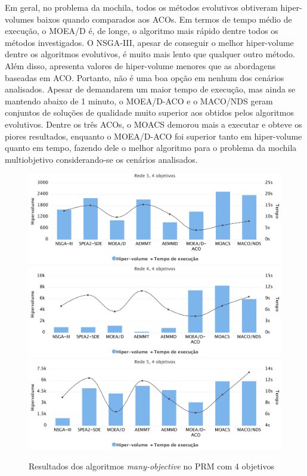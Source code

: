 Em geral, no problema da mochila, todos os métodos evolutivos obtiveram hiper-volumes baixos quando comparados aos ACOs. Em termos de tempo médio de execução, o MOEA/D é, de longe, o algoritmo mais rápido dentre todos os métodos investigados. O NSGA-III, apesar de conseguir o melhor hiper-volume dentre os algoritmos evolutivos, é muito mais lento que qualquer outro método. Além disso, apresenta valores de hiper-volume menores que as abordagens baseadas em ACO. Portanto, não é uma boa opção em nenhum dos cenários analisados. Apesar de demandarem um maior tempo de execução, mas ainda se mantendo abaixo de 1 minuto, o MOEA/D-ACO e o MACO/NDS geram conjuntos de soluções de qualidade muito superior aos obtidos pelos algoritmos evolutivos. Dentre os três ACOs, o MOACS demorou mais a executar e obteve os piores resultados, enquanto o MOEA/D-ACO foi superior tanto em hiper-volume quanto em tempo, fazendo dele o melhor algoritmo para o problema da mochila multiobjetivo considerando-se os cenários analisados.

\begin{figure}[!htbp]	
	\includegraphics[width=1\textwidth]{cap_experimentos/figs/etapa4/r3o4}
	\includegraphics[width=1\textwidth]{cap_experimentos/figs/etapa4/r4o4}
	\includegraphics[width=1\textwidth]{cap_experimentos/figs/etapa4/r5o4}
	\caption{\label{fig_exp4_mrp_o4}Resultados dos algoritmos \textit{many-objective} no PRM com 4 objetivos}
\end{figure}

